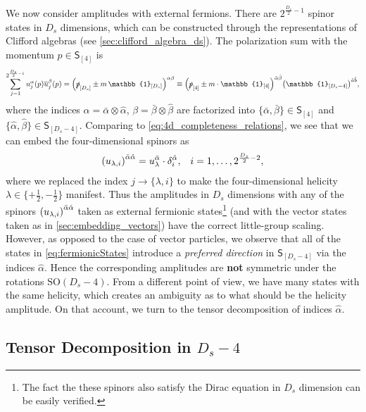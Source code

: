 We now consider amplitudes with external fermions.
There are $2^{\frac{D_s}{2}-1}$ spinor states in $D_s$ dimensions, 
which can be constructed through the representations of Clifford algebras (see \cref{sec:clifford_algebra_ds}).
The polarization sum with the momentum $p \in \mathsf{S}_{[4]}$ is
\begin{equation}
  \sum_{j=1}^{2^{\frac{D_s}{2}-1}} u^\alpha_j(p){\overline{u}_j^\beta}(p) = \qty(\slashed{p}_{[D_s]}  \pm m\,\mathbb{1}_{[D_s]})^{\alpha\beta} \equiv 
  \qty(\slashed{p}_{[4]} \pm m \cdot \mathbb{1}_{[4]})^{\bar{\alpha}\bar{\beta}} \qty(\mathbb{1}_{[D_s-4]})^{\hat{a}\hat{b}},
\end{equation}
where the indices $\alpha = \bar{\alpha}\otimes\hat{\alpha}$,  $\beta = \bar{\beta}\otimes \hat{\beta}$ are factorized into 
$\{\bar{\alpha},\bar{\beta}\}\in \mathsf{S}_{[4]}$ and $\{\hat{\alpha},\hat{\beta}\}\in \mathsf{S}_{[D_s-4]}$.
Comparing to \cref{eq:4d_completeness_relations}, we see that we can embed the four-dimensional spinors as
\begin{align} \label{eq:fermionicStates}
    \qty(u_{\lambda,i})^{\bar{\alpha}\hat{\alpha}} =  u_{\lambda}^{\bar{\alpha}} \cdot \delta_i^{\hat{\alpha}}, && i = 1,\ldots{},2^{\frac{D_s}{2}-2},
\end{align}
where we replaced the index $j \to \{\lambda, i \}$ to make the four-dimensional helicity $\lambda \in  \{+\frac{1}{2},-\frac{1}{2}\}$ manifest.
Thus the amplitudes in $D_s$ dimensions with any of the spinors $\qty(u_{\lambda,i})^{\bar{\alpha}\hat{\alpha}}$ taken as external fermionic states\footnote{
  The fact the these spinors also satisfy the Dirac equation in $D_s$ dimension can be easily verified.
}
(and with the vector states taken as in \cref{sec:embedding_vectors}) have the correct little-group scaling.
However, as opposed to the case of vector particles, we observe that 
all of the states in \cref{eq:fermionicStates} introduce a \emph{preferred direction} in  $\mathsf{S}_{[D_s-4]}$
via the indices $\hat{\alpha}$.
Hence the corresponding amplitudes are \textbf{not} symmetric under the rotations $\mathrm{SO}(D_s-4)$.
From a different point of view, we have many states with the same helicity, which creates an ambiguity as to what 
should be the helicity amplitude.
On that account, we turn to the tensor decomposition of indices $\hat{\alpha}$.

\subsection{Tensor Decomposition in $D_s-4$}
\label{sec:HelAmplHV}

